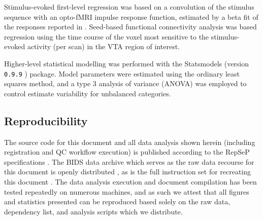 Stimulus-evoked first-level regression was based on a convolution of the stimulus sequence with an opto-fMRI impulse response function, estimated by a beta fit of the responses reported in \cite{Grandjean2019}.
Seed-based functional connectivity analysis was based regression using the time course of the voxel most sensitive to the stimulus-evoked activity (per scan) in the VTA region of interest.

Higher-level statistical modelling was performed with the Statsmodels (version \textcolor{mg}{\texttt{0.9.9}} \cite{statsmodels}) package.
Model parameters were estimated using the ordinary least squares method, and a type 3 analysis of variance (ANOVA) was employed to control estimate variability for unbalanced categories.

\subsection{Reproducibility}

The source code for this document and all data analysis shown herein (including registration and QC workflow execution) is published according to the RepSeP specifications \cite{repsep}.
The BIDS \cite{bids} data archive which serves as the raw data recourse for this document is openly distributed \cite{opfvta_bidsdata}, as is the full instruction set for recreating this document \cite{me}.
The data analysis execution and document compilation has been tested repeatedly on numerous machines, and as such we attest that all figures and statistics presented can be reproduced based solely on the raw data, dependency list, and analysis scripts which we distribute.
